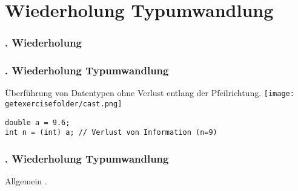 \def\stitle{Wiederholung Typumwandlung}
\section{\stitle}\label{K:wdh}
\begin{frame}
  \frametitle{\kap. Wiederholung}%
\tableofcontents[current]
\end{frame}

\begin{frame}[fragile]%
  \frametitle{\kap. \stitle}%
\medskip

Überführung von Datentypen ohne Verlust entlang der Pfeilrichtung.
\texttt{[image: \\getexercisefolder/cast.png]}

\begin{lstlisting}[style=java, frame=single]
double a = 9.6;
int n = (int) a; // Verlust von Information (n=9)
\end{lstlisting}
\end{frame}



\begin{frame}[fragile]%
  \frametitle{\kap. \stitle}%
\medskip

Allgemein .


\end{frame}
